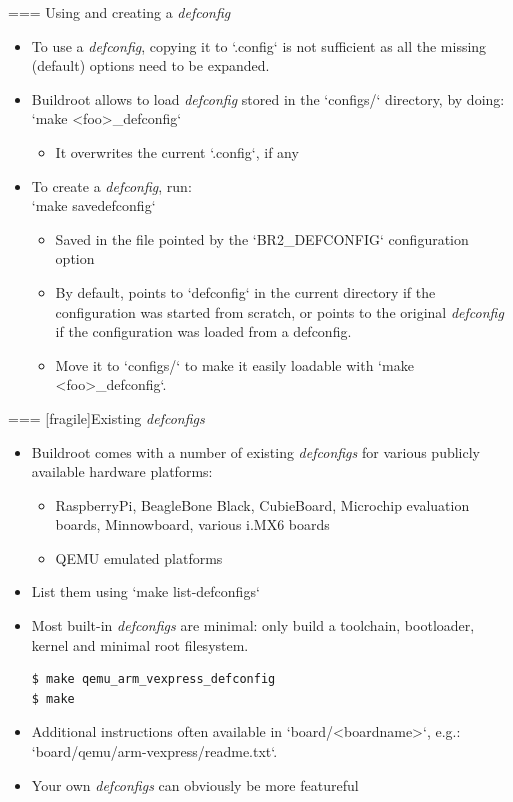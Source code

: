 === {Using and creating a {\em defconfig}}
  \begin{itemize}
  \item To use a {\em defconfig}, copying it to `.config` is not
    sufficient as all the missing (default) options need to be
    expanded.
  \item Buildroot allows to load {\em defconfig} stored in the
    `configs/` directory, by doing:
    `make <foo>_defconfig`
    \begin{itemize}
    \item It overwrites the current `.config`, if any
    \end{itemize}
  \item To create a {\em defconfig}, run:\\
    `make savedefconfig`
    \begin{itemize}
    \item Saved in the file pointed by the `BR2_DEFCONFIG`
      configuration option
    \item By default, points to `defconfig` in the current
      directory if the configuration was started from scratch, or
      points to the original {\em defconfig} if the configuration was
      loaded from a defconfig.
    \item Move it to `configs/` to make it easily loadable with
      `make <foo>_defconfig`.
    \end{itemize}
  \end{itemize}


=== [fragile]{Existing {\em defconfigs}}

  \begin{itemize}

  \item Buildroot comes with a number of existing {\em defconfigs} for
    various publicly available hardware platforms:
    \begin{itemize}
    \item RaspberryPi, BeagleBone Black, CubieBoard, Microchip evaluation
      boards, Minnowboard, various i.MX6 boards
    \item QEMU emulated platforms
    \end{itemize}
  \item List them using `make list-defconfigs`
  \item Most built-in {\em defconfigs} are minimal: only build a
    toolchain, bootloader, kernel and minimal root filesystem.
    \begin{block}{}
\begin{verbatim}
$ make qemu_arm_vexpress_defconfig
$ make
\end{verbatim}
\end{block}

\item Additional instructions often available in
  `board/<boardname>`, e.g.: `board/qemu/arm-vexpress/readme.txt`.
\item Your own {\em defconfigs} can obviously be more featureful
  \end{itemize}


